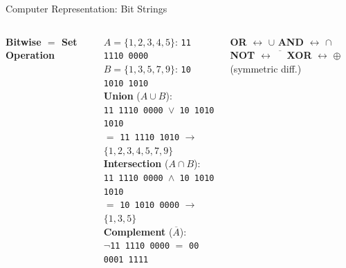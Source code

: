 \documentclass{beamer}
\begin{document}
\begin{frame}[t,shrink=5]{Computer Representation: Bit Strings}
\begin{columns}[T]
        \textbf{Bitwise $=$ Set Operation}
        \vspace{0.05cm}

        \scriptsize
        $A = \{1,2,3,4,5\}$: \texttt{11 1110 0000}\\
        $B = \{1,3,5,7,9\}$: \texttt{10 1010 1010}\\[6pt]
        \textbf{Union} ($A \cup B$):\\
        \texttt{11 1110 0000 $\lor$ 10 1010 1010}\\
        $=$ \texttt{11 1110 1010} $\to$ $\{1,2,3,4,5,7,9\}$\\[4pt]
        \textbf{Intersection} ($A \cap B$):\\
        \texttt{11 1110 0000 $\land$ 10 1010 1010}\\
        $=$ \texttt{10 1010 0000} $\to$ $\{1,3,5\}$\\[4pt]
        \textbf{Complement} ($\overline{A}$):\\
        $\lnot$\texttt{11 1110 0000} $=$ \texttt{00 0001 1111}

        \vspace{0.1cm}
        \begin{exampleblock}{}
            \scriptsize
            \textbf{OR} $\leftrightarrow$ $\cup$ \quad
            \textbf{AND} $\leftrightarrow$ $\cap$\\
            \textbf{NOT} $\leftrightarrow$ $\overline{\phantom{A}}$ \quad
            \textbf{XOR} $\leftrightarrow$ $\oplus$ (symmetric diff.)
        \end{exampleblock}
    \end{columns}
\end{frame}
\end{document}
